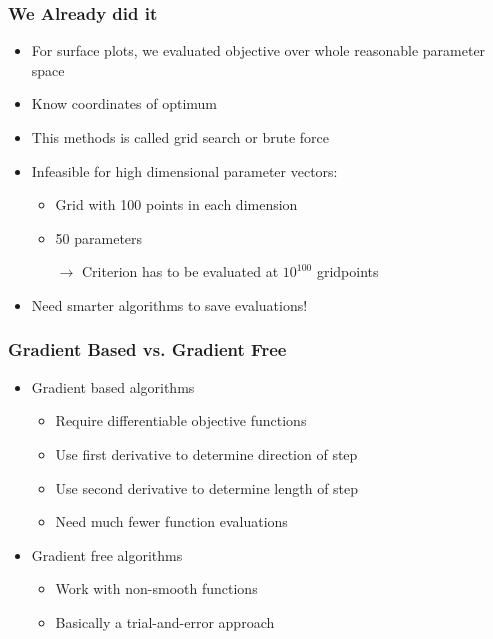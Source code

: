 \documentclass[11pt]{beamer}
\begin{document}
\begin{frame}[c]\frametitle{We Already did it}
    \begin{itemize}
        \item For surface plots, we evaluated objective over whole reasonable parameter space
        \item Know coordinates of optimum
        \item This methods is called grid search or brute force
        \item Infeasible for high dimensional parameter vectors:
        \begin{itemize}
            \item Grid with 100 points in each dimension
            \item 50 parameters
            \item[$\rightarrow$] Criterion has to be evaluated at $10^{100}$ gridpoints
        \end{itemize}
        \item Need smarter algorithms to save evaluations!
    \end{itemize}
\end{frame}



\begin{frame}[c]\frametitle{Gradient Based vs. Gradient Free}
    \begin{itemize}
        \item Gradient based algorithms
        \begin{itemize}
            \item Require differentiable objective functions
            \item Use first derivative to determine direction of step
            \item Use second derivative to determine length of step
            \item Need much fewer function evaluations
        \end{itemize}
        \item Gradient free algorithms
        \begin{itemize}
            \item Work with non-smooth functions
            \item Basically a trial-and-error approach
        \end{itemize}
    \end{itemize}
\end{frame}
\end{document}
